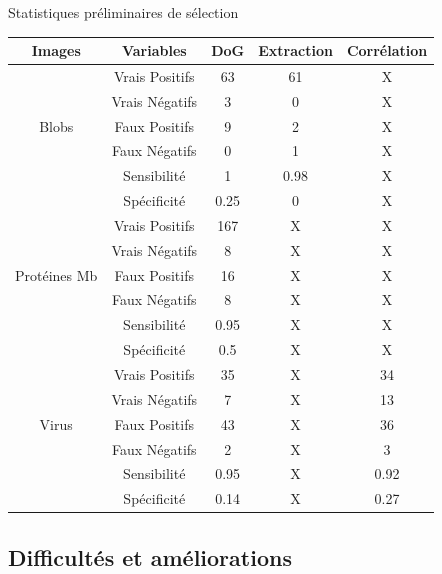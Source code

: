 \documentclass[11pt]{beamer}
\begin{document}
\begin{frame}
\frametitle{\subsecname} 
\begin{center}
Statistiques préliminaires de sélection \\
\end{center}
	\begin{table}[h]
	\begin{center}
	
	\begin{scriptsize}
	\begin{tabular}{|c|c|c|c|c|}
	\hline
	\textbf{Images} & \textbf{Variables} & \textbf{DoG} & \textbf{Extraction} & \textbf{Corrélation} \\
	\hline
	& Vrais Positifs  & 63 & 61 & X \\
	& Vrais Négatifs & 3 & 0 & X \\
Blobs & Faux Positifs & 9 & 2 & X \\
	& Faux Négatifs & 0 & 1 & X \\
	& Sensibilité & 1 & 0.98 & X \\
	& Spécificité & 0.25 & 0 & X \\
\hline
	& Vrais Positifs & 167 & X & X \\
	& Vrais Négatifs & 8 & X & X \\
Protéines Mb & Faux Positifs & 16 & X & X \\
	& Faux Négatifs & 8 & X & X \\
	& Sensibilité & 0.95 & X & X \\
	& Spécificité & 0.5 & X & X \\
	\hline
	& Vrais Positifs & 35 & X & 34 \\
	& Vrais Négatifs & 7 & X & 13 \\
Virus & Faux Positifs & 43 & X & 36 \\
	& Faux Négatifs & 2 & X & 3 \\
	& Sensibilité & 0.95 & X & 0.92 \\
	& Spécificité & 0.14 & X & 0.27 \\
	\hline
\end{tabular}
\end{scriptsize}
\end{center}
\end{table}
\end{frame}

\subsection{Difficultés et améliorations}
\end{document}
